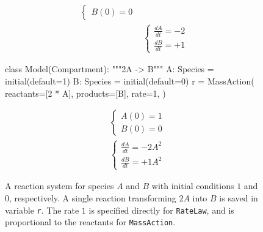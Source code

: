 \documentclass[namedate,numsec,webpdf,modern,large]{oup-authoring-template}
\theoremstyle{thmstyleone}%
\theoremstyle{thmstyletwo}%
\theoremstyle{thmstylethree}%
\newenvironment{CodeInput}{\begin{tcolorbox}[title=input,boxrule=0pt]}{\end{tcolorbox}}
\newcommand{\KeywordTok}[1]{\textcolor[rgb]{0.00,0.13,1.00}{#1}}
\newcommand{\ClassTok}[1]{\textcolor[rgb]{0.27,0.56,0.65}{#1}}
\newcommand{\OperatorTok}[1]{\textcolor[rgb]{0.00,0.00,0.00}{#1}}
\newcommand{\VariableTok}[1]{\textcolor[rgb]{0.00,0.06,0.50}{#1}}
\newcommand{\ValueTok}[1]{\textcolor[rgb]{0.13,0.57,0.41}{#1}}
\newcommand{\FunctionTok}[1]{\textcolor[rgb]{0.47,0.37,0.15}{#1}}
\newcommand{\NormalTok}[1]{\textcolor[rgb]{0.00,0.06,0.50}{#1}}
\newcommand{\CommentTok}[1]{\textcolor[rgb]{0.00,0.50,0.00}{#1}}
\begin{document}
\begin{figure}[t]
\begin{minipage}[t]{\columnwidth}
\begin{minipage}[c]{0.3\columnwidth}
\begin{align*}
\begin{cases}
          B(0) = 0
          \end{cases}
        \\
        & \begin{cases}
          \frac{dA}{dt} = -2 \\
          \frac{dB}{dt} = +1
          \end{cases}
      \end{align*}
  \end{minipage}%
  \end{minipage}%
  \newline
  \begin{minipage}[t]{\columnwidth}
      \centering 
      \begin{minipage}[c]{0.7\columnwidth}
\centering 
\begin{CodeInput}
\begin{Highlighting}[]
\KeywordTok{class}\ClassTok{ Model}\KeywordTok{(}\ClassTok{Compartment}\KeywordTok{)}:
  \CommentTok{"""2A {-}\textgreater{} B"""}
  \VariableTok{A}: \ClassTok{Species} \OperatorTok{=} \FunctionTok{initial}\KeywordTok{(}\VariableTok{default}\OperatorTok{=}\ValueTok{1}\KeywordTok{)}
  \VariableTok{B}: \ClassTok{Species} \OperatorTok{=} \FunctionTok{initial}\KeywordTok{(}\VariableTok{default}\OperatorTok{=}\ValueTok{0}\KeywordTok{)}
  \VariableTok{r} \OperatorTok{=} \ClassTok{MassAction}\KeywordTok{(}
    \VariableTok{reactants}\OperatorTok{=}\KeywordTok{[}\ValueTok{2} \OperatorTok{*} \VariableTok{A}\KeywordTok{]},
    \VariableTok{products}\OperatorTok{=}\NormalTok{\KeywordTok{[}B\KeywordTok{]},}
    \VariableTok{rate}\OperatorTok{=}\ValueTok{1}\NormalTok{,}
  \KeywordTok{)}
          \end{Highlighting}
          \end{CodeInput}
      \end{minipage}%
      \begin{minipage}[c]{0.3\columnwidth}
        \begin{align*}
          & \begin{cases}
              A(0) = 1 \\
              B(0) = 0
          \end{cases} \\
          & \begin{cases}
              \frac{dA}{dt} = -2 A^2 \\
              \frac{dB}{dt} = +1 A^2
            \end{cases}
        \end{align*}
      \end{minipage}%
  \end{minipage}%
  
  \caption{
    A reaction system for species \(A\) and \(B\)
    with initial conditions \(1\) and \(0\), respectively. A single reaction
    transforming \(2A\) into \(B\) is saved in variable \texttt{r}. The rate
    \(1\) is specified directly for \texttt{RateLaw}, and is proportional to
    the reactants for \texttt{MassAction}.
  }
  \label{fig-simbio}
\end{figure}
\end{document}

